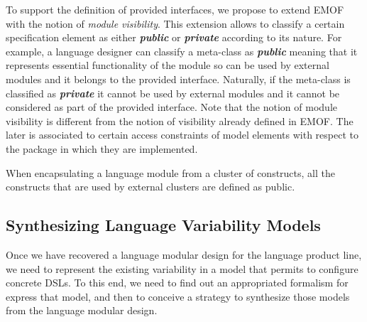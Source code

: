 To support the definition of provided interfaces, we propose to extend EMOF with the notion of \textit{module visibility}. This extension allows to classify a certain specification element as either \textsl{\textbf{public}} or \textsl{\textbf{private}} according to its nature. For example, a language designer can classify a meta-class as \textsl{\textbf{public}} meaning that it represents essential functionality of the module so can be used by external modules and it belongs to the provided interface. Naturally, if the meta-class is classified as \textsl{\textbf{private}} it cannot be used by external modules and it cannot be considered as part of the provided interface. Note that the notion of module visibility is different from the notion of visibility already defined in EMOF. The later is associated to  certain access constraints of model elements with respect to the package in which they are implemented.

When encapsulating a language module from a cluster of constructs, all the constructs that are used by external clusters are defined as public.



\subsection{Synthesizing Language Variability Models}

Once we have recovered a language modular design for the language product line, we need to represent the existing variability in a model that permits to configure concrete DSLs. To this end, we need to find out an appropriated formalism for express that model, and then to conceive a strategy to synthesize those models from the language modular design. 

